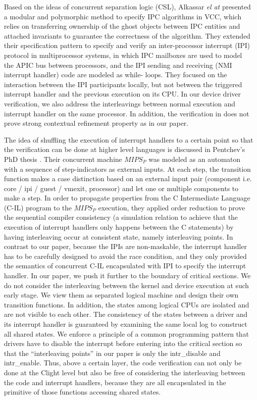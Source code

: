 Based on the ideas of concurrent separation logic (CSL), Alkassar {\em el at}
\cite{Alkassar:IPC}
presented a modular and polymorphic method to specify IPC algorithms in VCC,
which relies on transferring ownership of the ghost objects between IPC
entities and attached invariants to guarantee the correctness of the
algorithm. They extended their specification pattern to specify and verify an
inter-processor interrupt (IPI) protocol in multiprocessor systems, in which
IPC mailboxes are used to model the APIC bus between processors, and the IPI
sending and receiving (NMI interrupt handler) code are modeled as while-
loops. They focused on the interaction between the IPI participants locally,
but not between the triggered interrupt handler and the previous execution on
its CPU. In our device driver verification, we also address the interleavings
between normal execution and interrupt handler on the same processor.
In addition, the verification in \cite{Alkassar:IPC} does not
prove strong contextual refinement property as in our paper.

The idea of shuffling the execution of interrupt handlers to a certain point
so that the verification can be done at higher level languages is discussed in
Pentchev's PhD thesis \cite{Pentchev:2016}. Their concurrent machine $MIPS_{P}$
was modeled as an
automaton with a sequence of step-indicators as external inputs. At each step,
the transition function makes a case distinction based on an external input
pair (component i.e. core / ipi / guest / vmexit, processor) and let one or
multiple components to make a step. In order to propagate properties from the C
Intermediate Language (C-IL) program to the $MIPS_{P}$ execution, they applied
order reduction to prove the sequential compiler consistency (a simulation
relation to achieve that the execution of interrupt handlers only happens
between the C statements) by having interleaving occur at consistent state,
namely interleaving points. In contrast to our paper, because the IPIs are
non-maskable, the interrupt handler has to be carefully designed to avoid the
race condition, and they only provided the semantics of concurrent C-IL
encapsulated with IPI to specify the interrupt handler. In our paper, we push
it further to the boundary of critical sections. We do not consider the
interleaving between the kernel and device execution at such early stage. We
view them as separated logical machine and design their own transition functions.
In addition, the states among logical CPUs are isolated and are not visible
to each other. The consistency of the states between a driver and its
interrupt handler is guaranteed by examining the same local log to construct
all shared states. We enforce a principle of a common programming pattern that
drivers have to disable the interrupt before entering into the critical section
so that the ``interleaving points'' in our paper is only the \textsf{intr\_disable} and
\textsf{intr\_enable}. Thus, above a certain layer, the code verification can not only
be done at the Clight level but also be free of considering the interleaving between
the code and interrupt handlers, because they are all encapsulated in the primitive of
those functions accessing shared states.

